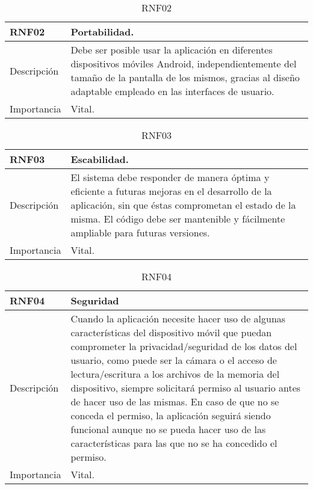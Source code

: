 \begin{table}[H]
\label{RNF02}
\begin{center}
\begin{tabular}{| l | p{10cm} |}
\hline
RNF02 & Portabilidad.\\
\hline
Descripción & Debe ser posible usar la aplicación en diferentes dispositivos móviles Android, independientemente del tamaño de la pantalla de los mismos, gracias al diseño adaptable empleado en las interfaces de usuario.\\
\hline
Importancia & Vital.\\
\hline
\end{tabular}
\end{center}
\caption{RNF02}
\end{table}

\begin{table}[H]
\label{RNF03}
\begin{center}
\begin{tabular}{| l | p{10cm} |}
\hline
RNF03 & Escabilidad.\\
\hline
Descripción & El sistema debe responder de manera óptima y eficiente a futuras mejoras en el desarrollo de la aplicación, sin que éstas comprometan el estado de la misma. El código debe ser mantenible y fácilmente ampliable para futuras versiones.\\
\hline
Importancia & Vital.\\
\hline
\end{tabular}
\end{center}
\caption{RNF03}
\end{table}

\begin{table}[H]
\label{RNF04}
\begin{center}
\begin{tabular}{| l | p{10cm} |}
\hline
RNF04 & Seguridad\\
\hline
Descripción & Cuando la aplicación necesite hacer uso de algunas características del dispositivo móvil que puedan comprometer la privacidad/seguridad de los datos del usuario, como puede ser la cámara o el acceso de lectura/escritura a los archivos de la memoria del dispositivo, siempre solicitará permiso al usuario antes de hacer uso de las mismas. En caso de que no se conceda el permiso, la aplicación seguirá siendo funcional aunque no se pueda hacer uso de las características para las que no se ha concedido el permiso.\\
\hline
Importancia & Vital.\\
\hline
\end{tabular}
\end{center}
\caption{RNF04}
\end{table} 

